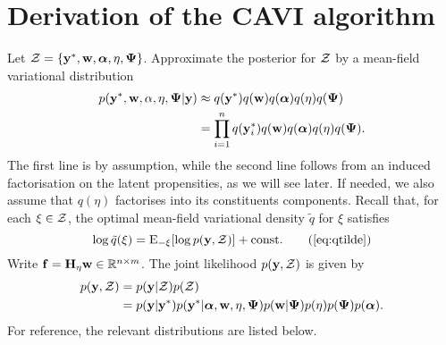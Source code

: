 \section{Derivation of the CAVI algorithm}

Let ${\mathcal Z} = \{{\mathbf y}^*,{\mathbf w},{\bm\alpha},\eta,{\bm\Psi} \}$.
Approximate the posterior for ${\mathcal Z}$ by a mean-field variational distribution
\begin{align*}
  p({\mathbf y}^*, {\mathbf w}, \alpha, \eta, {\bm\Psi} | {\mathbf y}) 
  &\approx q({\mathbf y}^*)q({\mathbf w})q({\bm\alpha})q(\eta)q({\bm\Psi}) \\
  &= \prod_{i=1}^n q({\mathbf y}_{i}^*)q({\mathbf w})q({\bm\alpha})q(\eta)q({\bm\Psi}).
\end{align*}
The first line is by assumption, while the second line follows from an induced factorisation on the latent propensities, as we will see later. 
If needed, we also assume that $q(\eta)$ factorises into its constituents components.
Recall that, for each $\xi\in{\mathcal Z}$, the optimal mean-field variational density $\tilde q$ for $\xi$ satisfies
\[
  \log \tilde q(\xi) = \E_{-\xi} [\log p(\by, \cZ)] + \const \tag{\ref{eq:qtilde}}
\]
Write ${\mathbf f} = {\mathbf H}_\eta {\mathbf w} \in \mathbb{R}^{n\times m}$.
The joint likelihood $p({\mathbf y}, {\mathcal Z})$ is given by
\begin{align*}
  p({\mathbf y}, {\mathcal Z}) 
  &= p({\mathbf y}|{\mathcal Z})p({\mathcal Z}) \\
  &= p({\mathbf y}|{\mathbf y}^*) p({\mathbf y}^* | {\bm\alpha},{\mathbf w},\eta,{\bm\Psi}) p({\mathbf w}|{\bm\Psi}) p(\eta) p({\bm\Psi})p({\bm\alpha}).
\end{align*}
For reference, the relevant distributions are listed below.

